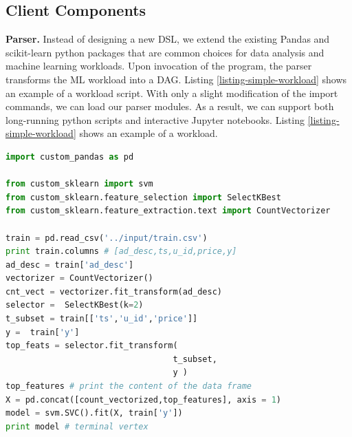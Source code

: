 \subsection{Client Components}
\textbf{Parser. }
Instead of designing a new DSL, we extend the existing Pandas and scikit-learn \cite{sklearn_api} python packages that are common choices for data analysis and machine learning workloads.
Upon invocation of the program, the parser transforms the ML workload into a DAG.
Listing \ref{listing-simple-workload} shows an example of a workload script.
With only a slight modification of the import commands, we can load our parser modules.
As a result, we can support both long-running python scripts and interactive Jupyter notebooks.
Listing \ref{listing-simple-workload} shows an example of a workload.
\begin{lstlisting}[language=Python, caption=Example script,captionpos=b,label = {listing-simple-workload}]
import custom_pandas as pd

from custom_sklearn import svm
from custom_sklearn.feature_selection import SelectKBest
from custom_sklearn.feature_extraction.text import CountVectorizer

train = pd.read_csv('../input/train.csv') 
print train.columns # [ad_desc,ts,u_id,price,y]
ad_desc = train['ad_desc']
vectorizer = CountVectorizer()
cnt_vect = vectorizer.fit_transform(ad_desc)
selector =  SelectKBest(k=2)
t_subset = train[['ts','u_id','price']]
y =  train['y']
top_feats = selector.fit_transform(
                                  t_subset,  
                                  y )
top_features # print the content of the data frame		     
X = pd.concat([count_vectorized,top_features], axis = 1)
model = svm.SVC().fit(X, train['y'])
print model # terminal vertex
\end{lstlisting}

